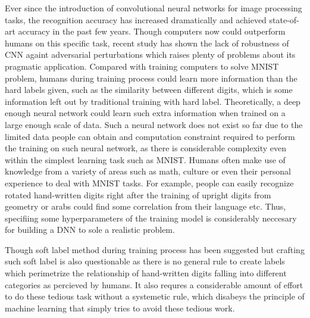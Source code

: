 \documentclass{article}
\begin{document}
Ever since the introduction of convolutional neural networks for image processing tasks, the recognition accuracy has increased dramatically and achieved state-of-art accuracy in the past few years. Though computers now could outperform humans on this specific task,
recent study has shown the lack of robustness of CNN againt adversarial perturbations which raises plenty of problems about its pragmatic application. 
Compared with training computers to solve MNIST problem, humans during training process could learn more information than the hard labels given, such as the similarity between different digits, 
which is some information left out by traditional training with hard label. 
Theoretically, a deep enough neural network could learn such extra information when trained on a large enough scale of data. Such a neural network does not exist so far due to the limited data people can obtain and computation constraint required to perform the training on such neural network, as there is considerable complexity even within the simplest learning task such as MNIST. Humans often make use of knowledge from a variety of areas such as math, culture or even their personal experience to deal with MNIST tasks. For example, people can easily recognize rotated hand-written digits right after the training of upright digits from geometry or arabs could find some correlation from their language etc.
Thus, specifiing some hyperparameters of the training model is considerably neccesary for building a DNN to sole a realistic problem.

Though soft label method during training process has been suggested but crafting such soft label is also questionable as there is no general rule to create labels which perimetrize the relationship of hand-written digits falling into different categories as percieved by humans.
It also requres a considerable amount of effort to do these tedious task without a systemetic rule, which disabeys the principle of machine learning that simply tries to avoid these tedious work.
\end{document}
